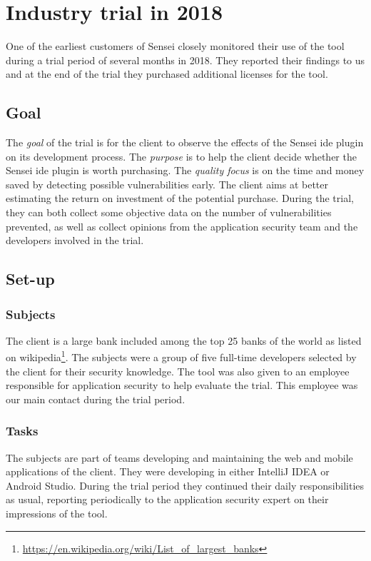 \section{Industry trial in 2018}
\label{sec:trial2018}

One of the earliest customers of Sensei closely monitored their use of the tool during a trial period of several months in 2018.
They reported their findings to us and at the end of the trial they purchased additional licenses for the tool.

\subsection{Goal}
The \textit{goal} of the trial is for the client to observe the effects of the Sensei \gls{ide} plugin on its development process.
The \textit{purpose} is to help the client decide whether the Sensei \gls{ide} plugin is worth purchasing.
The \textit{quality focus} is on the time and money saved by detecting possible vulnerabilities early.
The client aims at better estimating the return on investment of the potential purchase.
During the trial, they can both collect some objective data on the number of vulnerabilities prevented, as well as collect opinions from the application security team and the developers involved in the trial.

\subsection{Set-up}
\subsubsection{Subjects}
The client is a large bank included among the top 25 banks of the world as listed on wikipedia\footnote{\url{https://en.wikipedia.org/wiki/List\_of\_largest\_banks}}. The subjects were a group of five full-time developers selected by the client for their security knowledge. The tool was also given to an employee responsible for application security to help evaluate the trial. This employee was our main contact during the trial period.

\subsubsection{Tasks}
The subjects are part of teams developing and maintaining the web and mobile applications of the client. They were developing in either IntelliJ IDEA or Android Studio. During the trial period they continued their daily responsibilities as usual, reporting periodically to the application security expert on their impressions of the tool.

